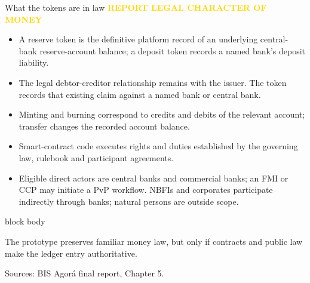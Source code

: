 \documentclass[aspectratio=169,12pt]{beamer}
\newcommand{\source}[1]{\vfill\par\fontsize{5.4}{6.5}\selectfont\color{Quiet}Sources: #1}
\newcommand{\tightitems}{\setlength{\itemsep}{0.42em}\setlength{\parskip}{0pt}}
\newcommand{\reporttag}[1]{\textcolor{Gold}{\fontsize{7.2}{8.5}\selectfont\bfseries REPORT #1}}
\newenvironment{statement}{%
  \begin{beamercolorbox}[sep=.18cm,rounded=false,wd=\linewidth]{block body}%
  \fontsize{13}{15.5}\selectfont\bfseries
}{\end{beamercolorbox}}
\begin{document}
\begin{frame}[shrink=35]{What the tokens are in law}
  \reporttag{LEGAL CHARACTER OF MONEY}\par\vspace{0.08cm}
  \fontsize{9.2}{11}\selectfont
  \begin{itemize}\tightitems
    \item A reserve token is the definitive platform record of an underlying central-bank reserve-account balance; a deposit token records a named bank's deposit liability.
    \item The legal debtor-creditor relationship remains with the issuer. The token records that existing claim against a named bank or central bank.
    \item Minting and burning correspond to credits and debits of the relevant account; transfer changes the recorded account balance.
    \item Smart-contract code executes rights and duties established by the governing law, rulebook and participant agreements.
    \item Eligible direct actors are central banks and commercial banks; an FMI or CCP may initiate a PvP workflow. NBFIs and corporates participate indirectly through banks; natural persons are outside scope.
  \end{itemize}
  \begin{statement}
    The prototype preserves familiar money law, but only if contracts and public law make the ledger entry authoritative.
  \end{statement}
  \source{BIS Agor\'a final report, Chapter 5.}
\end{frame}
\end{document}
